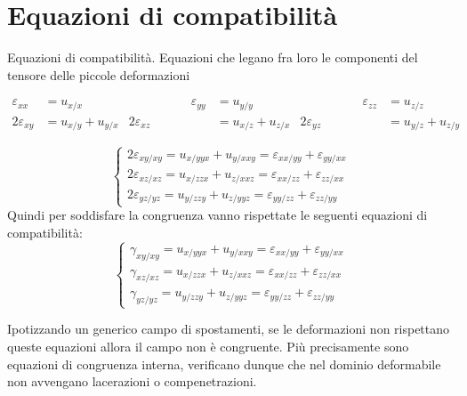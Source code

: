 \section{Equazioni di compatibilità}

\begin{definizioneBox}
Equazioni di compatibilità. Equazioni che legano fra loro le componenti del tensore delle piccole deformazioni
\end{definizioneBox}

\begin{align*}
     \varepsilon_{xx} &= u_{x/x}& \quad \quad\quad\quad\quad \varepsilon_{yy} &= u_{y/y}& \quad \quad\quad\quad\quad \varepsilon_{zz} &= u_{z/z} \\
      2\varepsilon_{xy} &= u_{x/y} + u_{y/x} &
      2\varepsilon_{xz} &= u_{x/z} + u_{z/x} &
      2\varepsilon_{yz} &= u_{y/z} + u_{z/y} 
\end{align*}

\begin{equation*}
    \begin{cases}
        2\varepsilon_{xy/xy} = u_{x/yyx} + u_{y/xxy} 
        = \varepsilon_{xx/yy} + \varepsilon_{yy/xx} \\[8pt]
        
        2\varepsilon_{xz/xz} = u_{x/zzx} + u_{z/xxz} 
        = \varepsilon_{xx/zz} + \varepsilon_{zz/xx} \\[8pt]
        
        2\varepsilon_{yz/yz} = u_{y/zzy} + u_{z/yyz} 
        = \varepsilon_{yy/zz} + \varepsilon_{zz/yy}
    \end{cases}
\end{equation*}
Quindi per soddisfare la congruenza vanno rispettate le seguenti equazioni di compatibilità:
\begin{equation*}
    \begin{cases}
        \gamma_{xy/xy} = u_{x/yyx} + u_{y/xxy} 
        = \varepsilon_{xx/yy} + \varepsilon_{yy/xx} \\[8pt]
        
        \gamma_{xz/xz} = u_{x/zzx} + u_{z/xxz} 
        = \varepsilon_{xx/zz} + \varepsilon_{zz/xx} \\[8pt]
        
        \gamma_{yz/yz} = u_{y/zzy} + u_{z/yyz} 
        = \varepsilon_{yy/zz} + \varepsilon_{zz/yy}
    \end{cases}
\end{equation*}

Ipotizzando un generico campo di spostamenti, se le deformazioni non rispettano queste equazioni allora il campo non è congruente.
Più precisamente sono equazioni di congruenza interna, verificano dunque che nel dominio deformabile non avvengano lacerazioni o compenetrazioni.

